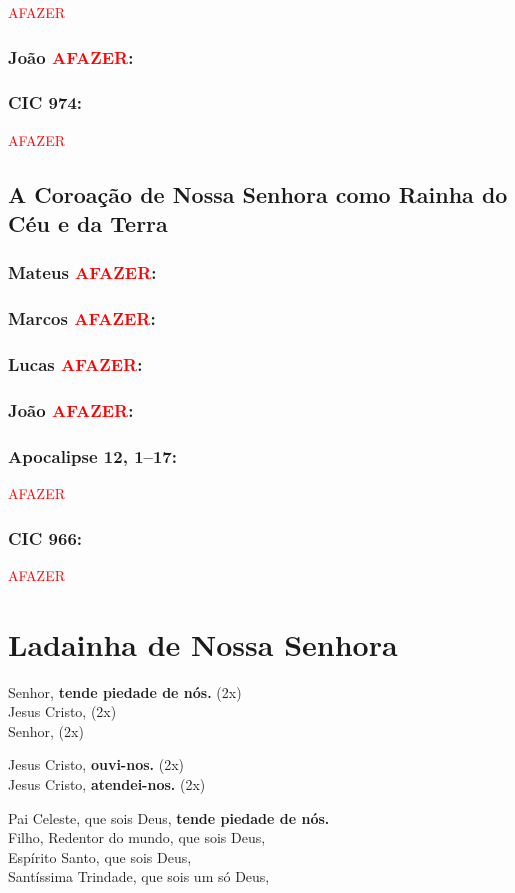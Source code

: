 \documentclass[10pt,a5paper]{book}
\newcommand{\from}[1]{\subsection*{#1}}
\newcommand{\TODO}{\textcolor{red}{\ttfamily AFAZER}}
\begin{document}
\TODO

\from{João \TODO:}

\from{CIC 974:}

\TODO


\section{A Coroação de Nossa Senhora como Rainha do Céu e da Terra}

\from{Mateus \TODO:}

\from{Marcos \TODO:}

\from{Lucas \TODO:}

\from{João \TODO:}

\from{Apocalipse 12, 1--17:}

\TODO

\from{CIC 966:}

\TODO


\chapter{Ladainha de Nossa Senhora}

Senhor, \textbf{tende piedade de nós.} (2x) \\
Jesus Cristo, (2x) \\
Senhor, (2x)

Jesus Cristo, \textbf{ouvi-nos.} (2x) \\
Jesus Cristo, \textbf{atendei-nos.} (2x)

Pai Celeste, que sois Deus, \textbf{tende piedade de nós.} \\
Filho, Redentor do mundo, que sois Deus, \\
Espírito Santo, que sois Deus, \\
Santíssima Trindade, que sois um só Deus,
\end{document}

